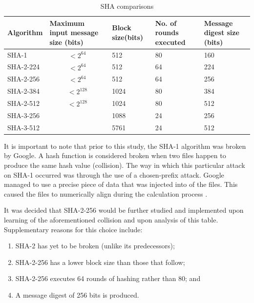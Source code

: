     
    \begin{table}[h]
    \caption{SHA comparisons}
    \centering
     \begin{tabular}{|p{} | p{}| p{}| p{}| p{}|} 
     \hline
    	\textbf{Algorithm} & \textbf{Maximum input message size (bits)} & \textbf{Block size(bits)} & \textbf{No. of rounds executed} & \textbf{Message digest size (bits)} \\ [1ex] 
     \hline\hline
     SHA-1 & \[ <2^{64}\] & 512 & 80 & 160 \\[1ex]
     \hline
     SHA-2-224 & \[ <2^{64}\] & 512 & 64 & 224 \\[1ex]
     \hline
     SHA-2-256 & \[ <2^{64}\] & 512 & 64 & 256 \\[1ex]
     \hline           
     SHA-2-384 & \[ <2^{128}\] & 1024 & 80 & 384 \\[1ex]
     \hline      
     SHA-2-512 & \[ <2^{128}\] & 1024 & 80 & 512 \\[1ex]
     \hline
     SHA-3-256 & \centering{Unlimited} & 1088 & 24 & 256 \\[1ex] 
     \hline
     SHA-3-512 & \centering{Unlimited} & 5761 & 24 & 512 \\[1ex]
     \hline
     \end{tabular}
     \label{table: SHA comparisons}
    \end{table}
    It is important to note that prior to this study, the SHA-1 algorithm was broken by Google. A hash function is considered broken when two files happen to produce the same hash value (collision). The way in which this particular attack on SHA-1 occurred was through the use of a chosen-prefix attack. Google managed to use a precise piece of data that was injected into of the files. This caused the files to numerically align during the calculation process \citep{Stevens2017}.
    
    It was decided that SHA-2-256 would be further studied and implemented upon learning of the aforementioned collision and upon analysis of this table. Supplementary reasons for this choice include:
    
        \begin{enumerate}[label=\roman*.]
            
            \item SHA-2 has yet to be broken (unlike its predecessors);
            \item SHA-2-256 has a lower block size than those that follow; \item SHA-2-256 executes 64 rounds of hashing rather than 80; and
            \item A message digest of 256 bits is produced.

        \end{enumerate}
    
